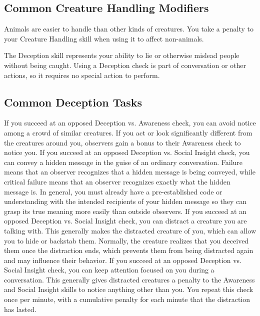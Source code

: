     \subsection{Common Creature Handling Modifiers}
        Animals are easier to handle than other kinds of creatures.
        You take a  penalty to your Creature Handling skill when using it to affect non-animals.

\newpage
{}
        The Deception skill represents your ability to lie or otherwise mislead people without being caught.
        Using a Deception check is part of conversation or other actions, so it requires no special action to perform.

    \subsection{Common Deception Tasks}
         If you succeed at an opposed Deception vs. Awareness check, you can avoid notice among a crowd of similar creatures.
        If you act or look significantly different from the creatures around you, observers gain a bonus to their Awareness check to notice you.
         If you succeed at an opposed Deception vs. Social Insight check, you can convey a hidden message in the guise of an ordinary conversation.
        Failure means that an observer recognizes that a hidden message is being conveyed, while critical failure means that an observer recognizes exactly what the hidden message is.
        In general, you must already have a pre-established code or understanding with the intended recipients of your hidden message so they can grasp its true meaning more easily than outside observers.
         If you succeed at an opposed Deception vs. Social Insight check, you can distract a creature you are talking with.
        This generally makes the distracted creature  \partiallyunaware of you, which can allow you to hide or backstab them.
        Normally, the creature realizes that you deceived them once the distraction ends, which prevents them from being distracted again and may influence their behavior.
         If you succeed at an opposed Deception vs. Social Insight check, you can keep attention focused on you during a conversation.
        This generally gives distracted creatures a  penalty to the Awareness and Social Insight skills to notice anything other than you.
        You repeat this check once per minute, with a cumulative  penalty for each minute that the distraction has lasted.
